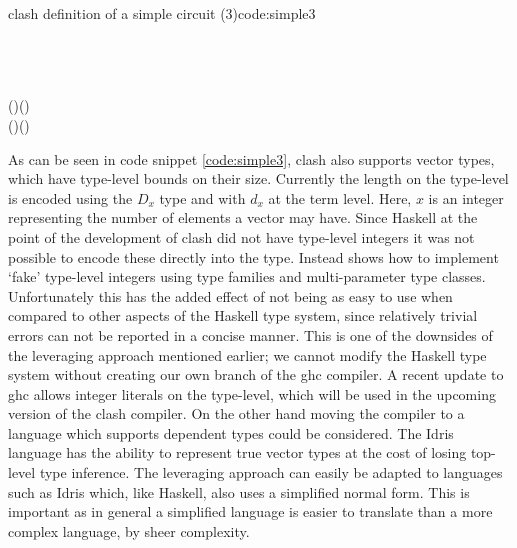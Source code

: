 \begin{texexptitled}{\gls{clash} definition of a simple circuit (3)}{code:simple3}
\begin{hscode}\SaveRestoreHook
{}%
%
%
%
\>[B]{}\mathbin{::}\;\;\to {}\<[E]%
\\
\>[B]{}\;\mathrel{=}\mathbin{\$}\;\;\<[E]%
\\
\>[B]{}\<[5]%
\>[5]{}\<[E]%
\\
\>[5]{}\<[9]%
\>[9]{}\mathrel{=}\;(\mathbin{!})\;(\mathbin{!}){}\<[E]%
\\
\>[5]{}\<[9]%
\>[9]{}\mathrel{=}\;(\mathbin{!})\;(\mathbin{!}){}\<[E]%
\ColumnHook
\end{hscode}\resethooks
\end{texexptitled}

As can be seen in code snippet \ref{code:simple3}, \gls{clash} also supports vector types, which have type-level bounds on their size. 
Currently the length on the type-level is encoded using the $D_x$ type and with $d_x$ at the term level. 
Here, $x$ is an integer representing the number of elements a vector may have.
Since Haskell at the point of the development of \gls{clash} did not have type-level integers it was not possible to encode these directly into the type.
Instead \citeauthor{mcbride2002faking} shows\cite{mcbride2002faking} how to implement `fake' type-level integers using type families and multi-parameter type classes.
Unfortunately this has the added effect of not being as easy to use when compared to other aspects of the Haskell type system, since relatively trivial errors can not be reported in a concise manner.
This is one of the downsides of the leveraging approach mentioned earlier; we cannot modify the Haskell type system without creating our own branch of the \gls{ghc} compiler.
A recent update to \gls{ghc} allows integer literals on the type-level, which will be used in the upcoming version of the \gls{clash} compiler.
On the other hand moving the compiler to a language which supports dependent types could be considered. 
The Idris\cite{brady2011idris} language has the ability to represent true vector types at the cost of losing top-level type inference.
The leveraging approach can easily be adapted to languages such as Idris which, like Haskell, also uses a simplified normal form.
This is important as in general a simplified language is easier to translate than a more complex language, by sheer complexity.

